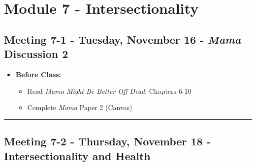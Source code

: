 \documentclass[
]{book}
\providecommand{\tightlist}{%
  \setlength{\itemsep}{0pt}\setlength{\parskip}{0pt}}
\begin{document}
\newpage

\hypertarget{module-7---intersectionality}{%
\section{Module 7 - Intersectionality}\label{module-7---intersectionality}}

\hypertarget{meeting-7-1---tuesday-november-16---mama-discussion-2}{%
\subsection*{\texorpdfstring{Meeting 7-1 - Tuesday, November 16 - \emph{Mama} Discussion 2}{Meeting 7-1 - Tuesday, November 16 - Mama Discussion 2}}\label{meeting-7-1---tuesday-november-16---mama-discussion-2}}

\begin{itemize}
\tightlist
\item
  \textbf{Before Class:}

  \begin{itemize}
  \tightlist
  \item
    Read \emph{Mama Might Be Better Off Dead}, Chapters 6-10
  \item
    Complete \emph{Mama} Paper 2 (Canvas)
  \end{itemize}
\end{itemize}

\begin{center}\rule{0.5\linewidth}{0.5pt}\end{center}

\hypertarget{meeting-7-2---thursday-november-18---intersectionality-and-health}{%
\subsection*{Meeting 7-2 - Thursday, November 18 - Intersectionality and Health}\label{meeting-7-2---thursday-november-18---intersectionality-and-health}}
\end{document}
